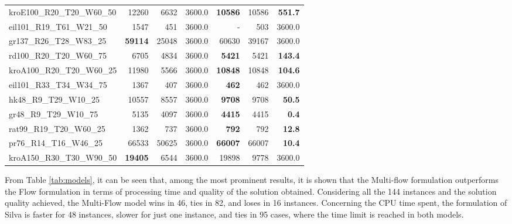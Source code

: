 \documentclass{ro}
\begin{document}
\begin{table}[!htb]
\begin{tabular}{lr@{\hspace{0.5\tabcolsep}}r@{\hspace{\tabcolsep}}r@{\hspace{3.0\tabcolsep}}r@{\hspace{0.3\tabcolsep}}r@{\hspace{0.5\tabcolsep}}r}
		kroE100\_R20\_T20\_W60\_50  & 12260                 & 6632  & 3600.0 & \textbf{10586}        & 10586                 & \textbf{551.7}  \\
		eil101\_R19\_T61\_W21\_50   & 1547                  & 451   & 3600.0 & - & 503                   & 3600.0          \\
		gr137\_R26\_T28\_W83\_25    & \textbf{59114}        & 25048 & 3600.0 & 60630                 & 39167                 & 3600.0          \\
		rd100\_R20\_T20\_W60\_75    & 6705                  & 4834  & 3600.0 & \textbf{5421}         & 5421                  & \textbf{143.4}  \\
		kroA100\_R20\_T20\_W60\_25  & 11980                 & 5566  & 3600.0 & \textbf{10848}        & 10848                 & \textbf{104.6}  \\
		eil101\_R33\_T34\_W34\_75   & 1367                  & 407   & 3600.0 & \textbf{462}          & 462                   & 3600.0          \\
		hk48\_R9\_T29\_W10\_25      & 10557                 & 8557  & 3600.0 & \textbf{9708}         & 9708                  & \textbf{50.5}   \\
		gr48\_R9\_T29\_W10\_75      & 5135                  & 4097  & 3600.0 & \textbf{4415}         & 4415                  & \textbf{0.4}    \\
		rat99\_R19\_T20\_W60\_25    & 1362                  & 737   & 3600.0 & \textbf{792}          & 792                   & \textbf{12.8}   \\
		pr76\_R14\_T16\_W46\_25     & 66533                 & 50625 & 3600.0 & \textbf{66007}        & 66007                 & \textbf{10.4}   \\
		kroA150\_R30\_T30\_W90\_50  & \textbf{19405}        & 6544  & 3600.0 & 19898                 & 9778                  & 3600.0   \\
		\hline      
	\end{tabular}
\end{table}

From Table \ref{tab:models}, it can be seen that, among the most prominent results, it is shown that the Multi-flow formulation \cite{silva2009problema}  outperforms the Flow formulation  \cite{lyra2004problema} in terms of processing time and quality of the solution obtained. Considering all the 144 instances and the solution quality achieved, the Multi-Flow model wins in 46, ties in 82, and loses in 16 instances. Concerning the CPU time spent, the formulation of Silva \cite{silva2009problema} is faster for 48 instances, slower for just one instance, and ties in 95 cases, where the time limit is reached in both models.
\end{document}
